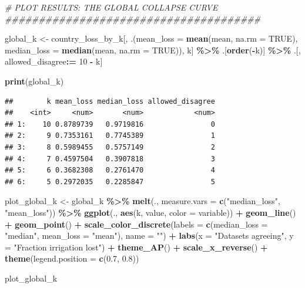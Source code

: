 \documentclass[
  11pt,
]{article}
\newenvironment{Shaded}{\begin{snugshade}}{\end{snugshade}}
\newcommand{\AttributeTok}[1]{\textcolor[rgb]{0.13,0.29,0.53}{#1}}
\newcommand{\CommentTok}[1]{\textcolor[rgb]{0.56,0.35,0.01}{\textit{#1}}}
\newcommand{\ConstantTok}[1]{\textcolor[rgb]{0.56,0.35,0.01}{#1}}
\newcommand{\DecValTok}[1]{\textcolor[rgb]{0.00,0.00,0.81}{#1}}
\newcommand{\FloatTok}[1]{\textcolor[rgb]{0.00,0.00,0.81}{#1}}
\newcommand{\FunctionTok}[1]{\textcolor[rgb]{0.13,0.29,0.53}{\textbf{#1}}}
\newcommand{\NormalTok}[1]{#1}
\newcommand{\OtherTok}[1]{\textcolor[rgb]{0.56,0.35,0.01}{#1}}
\newcommand{\SpecialCharTok}[1]{\textcolor[rgb]{0.81,0.36,0.00}{\textbf{#1}}}
\newcommand{\StringTok}[1]{\textcolor[rgb]{0.31,0.60,0.02}{#1}}
\begin{document}
\begin{Shaded}
\begin{Highlighting}[]
\CommentTok{\# PLOT RESULTS: THE GLOBAL COLLAPSE CURVE \#\#\#\#\#\#\#\#\#\#\#\#\#\#\#\#\#\#\#\#\#\#\#\#\#\#\#\#\#\#\#\#\#\#\#\#\#\#}

\NormalTok{global\_k }\OtherTok{\textless{}{-}}\NormalTok{ country\_loss\_by\_k[, .(}\AttributeTok{mean\_loss   =} \FunctionTok{mean}\NormalTok{(mean, }\AttributeTok{na.rm =} \ConstantTok{TRUE}\NormalTok{),}
                                  \AttributeTok{median\_loss =} \FunctionTok{median}\NormalTok{(mean, }\AttributeTok{na.rm =} \ConstantTok{TRUE}\NormalTok{)), k] }\SpecialCharTok{\%\textgreater{}\%}
\NormalTok{  .[}\FunctionTok{order}\NormalTok{(}\SpecialCharTok{{-}}\NormalTok{k)] }\SpecialCharTok{\%\textgreater{}\%}
\NormalTok{  .[, allowed\_disagree}\SpecialCharTok{:=} \DecValTok{10} \SpecialCharTok{{-}}\NormalTok{ k]}

\FunctionTok{print}\NormalTok{(global\_k)}
\end{Highlighting}
\end{Shaded}

\begin{verbatim}
##        k mean_loss median_loss allowed_disagree
##    <int>     <num>       <num>            <num>
## 1:    10 0.8789739   0.9719816                0
## 2:     9 0.7353161   0.7745389                1
## 3:     8 0.5989455   0.5757149                2
## 4:     7 0.4597504   0.3907818                3
## 5:     6 0.3682308   0.2761470                4
## 6:     5 0.2972035   0.2285847                5
\end{verbatim}

\begin{Shaded}
\begin{Highlighting}[]
\NormalTok{plot\_global\_k }\OtherTok{\textless{}{-}}\NormalTok{ global\_k }\SpecialCharTok{\%\textgreater{}\%}
  \FunctionTok{melt}\NormalTok{(., }\AttributeTok{measure.vars =} \FunctionTok{c}\NormalTok{(}\StringTok{"median\_loss"}\NormalTok{, }\StringTok{"mean\_loss"}\NormalTok{)) }\SpecialCharTok{\%\textgreater{}\%}
  \FunctionTok{ggplot}\NormalTok{(., }\FunctionTok{aes}\NormalTok{(k, value, }\AttributeTok{color =}\NormalTok{ variable)) }\SpecialCharTok{+}
  \FunctionTok{geom\_line}\NormalTok{() }\SpecialCharTok{+}
  \FunctionTok{geom\_point}\NormalTok{()  }\SpecialCharTok{+}
  \FunctionTok{scale\_color\_discrete}\NormalTok{(}\AttributeTok{labels =} \FunctionTok{c}\NormalTok{(}\AttributeTok{median\_loss =} \StringTok{"median"}\NormalTok{, }\AttributeTok{mean\_loss =} \StringTok{"mean"}\NormalTok{),}
                       \AttributeTok{name =} \StringTok{""}\NormalTok{) }\SpecialCharTok{+}
  \FunctionTok{labs}\NormalTok{(}\AttributeTok{x =} \StringTok{"Datasets agreeing"}\NormalTok{, }\AttributeTok{y =} \StringTok{"Fraction irrigation lost"}\NormalTok{) }\SpecialCharTok{+}
  \FunctionTok{theme\_AP}\NormalTok{() }\SpecialCharTok{+}
  \FunctionTok{scale\_x\_reverse}\NormalTok{() }\SpecialCharTok{+}
  \FunctionTok{theme}\NormalTok{(}\AttributeTok{legend.position =} \FunctionTok{c}\NormalTok{(}\FloatTok{0.7}\NormalTok{, }\FloatTok{0.8}\NormalTok{))}

\NormalTok{plot\_global\_k}
\end{Highlighting}
\end{Shaded}
\end{document}
